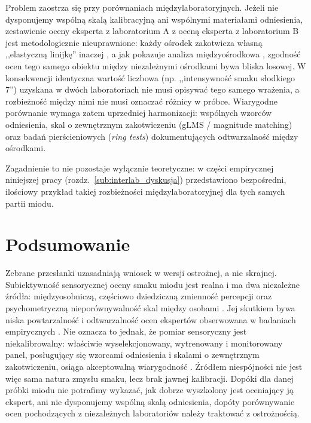 \documentclass[12pt,a4paper]{article}
\begin{document}
Problem zaostrza się przy porównaniach międzylaboratoryjnych. Jeżeli nie dysponujemy wspólną skalą
kalibracyjną ani wspólnymi materiałami odniesienia, zestawienie oceny eksperta z laboratorium A
z oceną eksperta z laboratorium B jest metodologicznie nieuprawnione: każdy ośrodek zakotwicza
własną ,,elastyczną linijkę'' inaczej \cite{bartoshuk2003labeled}, a jak pokazuje analiza
międzyośrodkowa \cite{hodgson2009concordance}, zgodność ocen tego samego obiektu między
niezależnymi ośrodkami bywa bliska losowej. W konsekwencji identyczna wartość liczbowa (np.
,,intensywność smaku słodkiego 7'') uzyskana w dwóch laboratoriach nie musi opisywać tego samego
wrażenia, a rozbieżność między nimi nie musi oznaczać różnicy w próbce. Wiarygodne porównanie
wymaga zatem uprzedniej harmonizacji: wspólnych wzorców odniesienia, skal o zewnętrznym
zakotwiczeniu (gLMS / magnitude matching) oraz badań pierścieniowych (\emph{ring tests})
dokumentujących odtwarzalność między ośrodkami.

Zagadnienie to nie pozostaje wyłącznie teoretyczne: w części empirycznej niniejszej
pracy (rozdz.~\ref{sub:interlab_dyskusja}) przedstawiono bezpośredni, ilościowy
przykład takiej rozbieżności międzylaboratoryjnej dla tych samych partii miodu.

\section{Podsumowanie}
 
Zebrane przesłanki uzasadniają wniosek w wersji ostrożnej, a nie skrajnej. Subiektywność
sensorycznej oceny smaku miodu jest realna i ma dwa niezależne źródła: międzyosobniczą, częściowo
dziedziczną zmienność percepcji \cite{wise2007twin,fushan2010sweet} oraz psychometryczną
nieporównywalność skal między osobami \cite{bartoshuk2003labeled,bartoshuk2000comparing}. Jej
skutkiem bywa niska powtarzalność i odtwarzalność ocen ekspertów obserwowana w badaniach
empirycznych \cite{hodgson2008judge,hodgson2009concordance}. Nie oznacza to jednak, że pomiar
sensoryczny jest niekalibrowalny: właściwie wyselekcjonowany, wytrenowany i monitorowany panel,
posługujący się wzorcami odniesienia i skalami o zewnętrznym zakotwiczeniu, osiąga akceptowalną
wiarygodność \cite{sipos2021panel,bartoshuk2004valid}. Źródłem niespójności nie jest więc sama
natura zmysłu smaku, lecz brak jawnej kalibracji. Dopóki dla danej próbki miodu nie potrafimy
wykazać, jak dobrze wyszkolony jest oceniający ją ekspert, ani nie dysponujemy wspólną skalą
odniesienia, dopóty porównywanie ocen pochodzących z niezależnych laboratoriów należy traktować
z ostrożnością.
\end{document}
